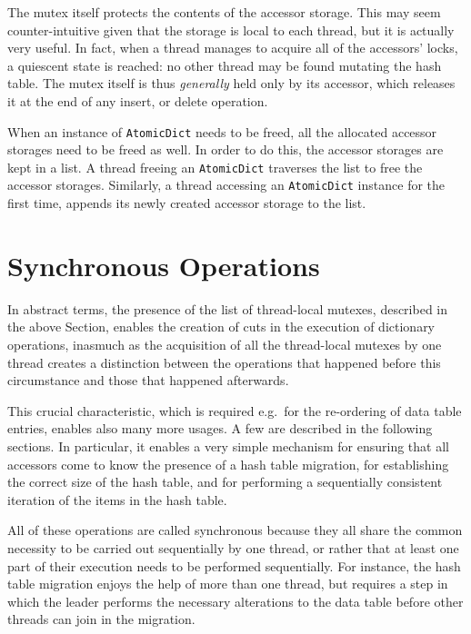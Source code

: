 The mutex itself protects the contents of the accessor storage.
This may seem counter-intuitive given that the storage is local to each thread, but it is actually very useful.
In fact, when a thread manages to acquire all of the accessors' locks, a quiescent state is reached: no other thread may be found mutating the hash table.
The mutex itself is thus \emph{generally} held only by its accessor, which releases it at the end of any insert, or delete operation.

When an instance of \texttt{AtomicDict} needs to be freed, all the allocated accessor storages need to be freed as well.
In order to do this, the accessor storages are kept in a list.
A thread freeing an \texttt{AtomicDict} traverses the list to free the accessor storages.
Similarly, a thread accessing an \texttt{AtomicDict} instance for the first time, appends its newly created accessor storage to the list.


\section{Synchronous Operations}\label{sec:synchronous-operations}

In abstract terms, the presence of the list of thread-local mutexes, described in the above Section, enables the creation of cuts in the execution of dictionary operations, inasmuch as the acquisition of all the thread-local mutexes by one thread creates a distinction between the operations that happened before this circumstance and those that happened afterwards.

This crucial characteristic, which is required e.g.\ for the re-ordering of data table entries, enables also many more usages.
A few are described in the following sections.
In particular, it enables a very simple mechanism for ensuring that all accessors come to know the presence of a hash table migration, for establishing the correct size of the hash table, and for performing a sequentially consistent iteration of the items in the hash table.

All of these operations are called synchronous because they all share the common necessity to be carried out sequentially by one thread, or rather that at least one part of their execution needs to be performed sequentially.
For instance, the hash table migration enjoys the help of more than one thread, but requires a step in which the leader performs the necessary alterations to the data table before other threads can join in the migration.

